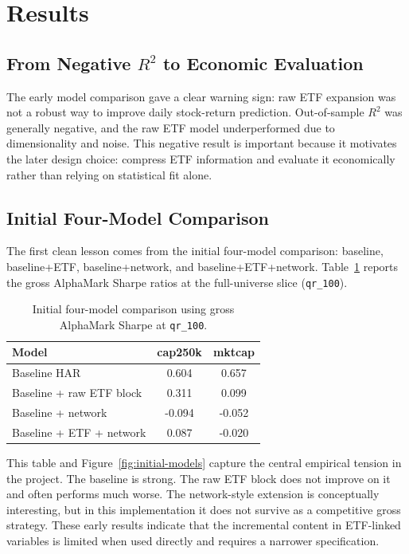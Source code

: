 \section{Results}
\label{sec:results}

\subsection{From Negative $R^2$ to Economic Evaluation}

The early model comparison gave a clear warning sign: raw ETF expansion was not a robust way to improve daily stock-return prediction. Out-of-sample $R^2$ was generally negative, and the raw ETF model underperformed due to dimensionality and noise. This negative result is important because it motivates the later design choice: compress ETF information and evaluate it economically rather than relying on statistical fit alone.

\subsection{Initial Four-Model Comparison}

The first clean lesson comes from the initial four-model comparison: baseline, baseline+ETF, baseline+network, and baseline+ETF+network. Table~\ref{tab:initial-models} reports the gross AlphaMark Sharpe ratios at the full-universe slice (\texttt{qr\_100}).

\begin{table}[H]
\centering
\caption{Initial four-model comparison using gross AlphaMark Sharpe at \texttt{qr\_100}.}
\label{tab:initial-models}
\begin{tabular}{lcc}
\toprule
Model & cap250k & mktcap \\
\midrule
Baseline HAR & 0.604 & 0.657 \\
Baseline + raw ETF block & 0.311 & 0.099 \\
Baseline + network & -0.094 & -0.052 \\
Baseline + ETF + network & 0.087 & -0.020 \\
\bottomrule
\end{tabular}
\end{table}

This table and Figure~\ref{fig:initial-models} capture the central empirical tension in the project. The baseline is strong. The raw ETF block does not improve on it and often performs much worse. The network-style extension is conceptually interesting, but in this implementation it does not survive as a competitive gross strategy. These early results indicate that the incremental content in ETF-linked variables is limited when used directly and requires a narrower specification.

